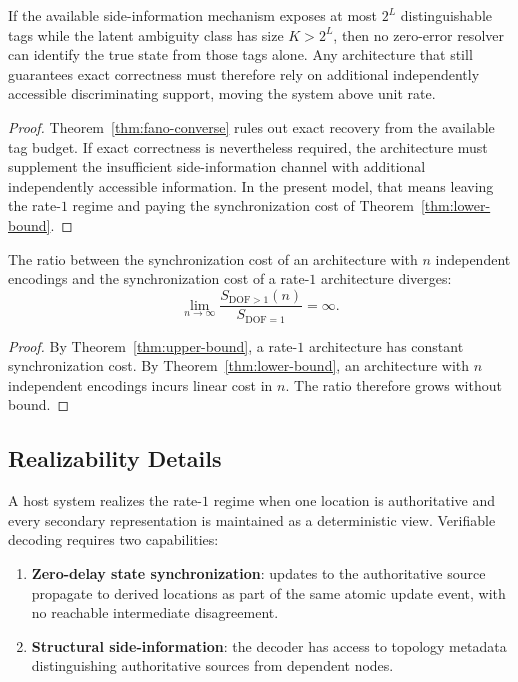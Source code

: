 \begin{lemma}\label{lem:info-dof}
If the available side-information mechanism exposes at most $2^L$ distinguishable tags while the latent ambiguity class has size $K>2^L$, then no zero-error resolver can identify the true state from those tags alone. Any architecture that still guarantees exact correctness must therefore rely on additional independently accessible discriminating support, moving the system above unit rate.
\end{lemma}

\begin{proof}
Theorem~\ref{thm:fano-converse} rules out exact recovery from the available tag budget. If exact correctness is nevertheless required, the architecture must supplement the insufficient side-information channel with additional independently accessible information. In the present model, that means leaving the rate-$1$ regime and paying the synchronization cost of Theorem~\ref{thm:lower-bound}.
\end{proof}

\begin{theorem}\label{thm:unbounded-gap}
The ratio between the synchronization cost of an architecture with $n$ independent encodings and the synchronization cost of a rate-$1$ architecture diverges:
\[
\lim_{n\to\infty}\frac{S_{\mathrm{DOF}>1}(n)}{S_{\mathrm{DOF}=1}}=\infty.
\]
\end{theorem}

\begin{proof}
By Theorem~\ref{thm:upper-bound}, a rate-$1$ architecture has constant synchronization cost. By Theorem~\ref{thm:lower-bound}, an architecture with $n$ independent encodings incurs linear cost in $n$. The ratio therefore grows without bound.
\end{proof}

\subsection{Realizability Details}

A host system realizes the rate-$1$ regime when one location is authoritative and every secondary representation is maintained as a deterministic view. Verifiable decoding requires two capabilities:
\begin{enumerate}
\item \textbf{Zero-delay state synchronization}: updates to the authoritative source propagate to derived locations as part of the same atomic update event, with no reachable intermediate disagreement.
\item \textbf{Structural side-information}: the decoder has access to topology metadata distinguishing authoritative sources from dependent nodes.
\end{enumerate}

